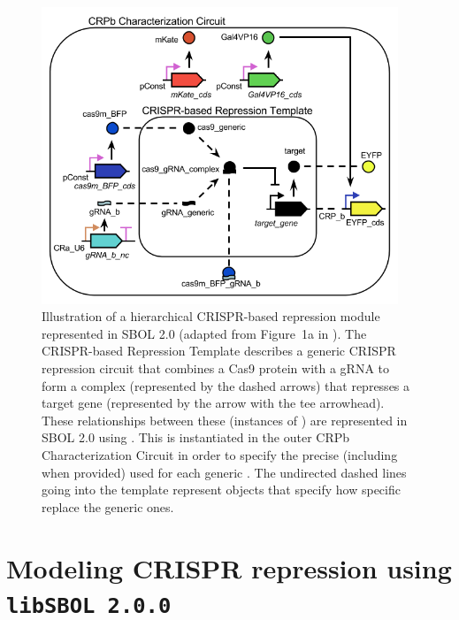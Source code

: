 \begin{figure}[tbph]
\begin{center}
  \includegraphics[width=0.95\textwidth]{figures/crispr_repression2} 
\end{center}
\caption{\label{fig:fig-CRPb} Illustration of a hierarchical CRISPR-based repression module represented in SBOL 2.0 (adapted from Figure~1a in \cite{kiani2014crispr}). The CRISPR-based Repression Template  describes a generic CRISPR repression circuit that combines a Cas9 protein with a gRNA to form a complex (represented by the dashed arrows) that represses a target gene (represented by the arrow with the tee arrowhead).  These relationships between these  (instances of ) are represented in SBOL 2.0 using .  This  is instantiated in the outer CRPb Characterization Circuit  in order to specify the precise (including  when provided)   used for each generic . The undirected dashed lines going into the template  represent  objects that specify how specific  replace the generic ones.}
\end{figure}

\section*{Modeling CRISPR repression using {\tt libSBOL 2.0.0}}

